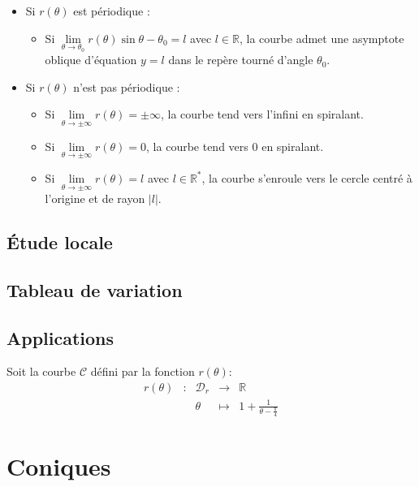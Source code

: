 \begin{prop}
\begin{itemize}
    \item Si $r(\theta)$ est périodique :
    \begin{itemize}
        \item Si $\lim\limits_{\theta\to \theta_0}r(\theta)\sin{\theta-\theta_0}=l$ avec $l\in\mathbb{R}$, la courbe admet une asymptote oblique d'équation $y=l$ dans le repère tourné d'angle $\theta_0$.
    \end{itemize}
    \item Si $r(\theta)$ n'est pas périodique :
    \begin{itemize}
        \item Si $\lim\limits_{\theta\to\pm\infty}r(\theta)=\pm\infty$, la courbe tend vers l'infini en spiralant.
        \item Si $\lim\limits_{\theta\to\pm\infty}r(\theta)=0$, la courbe tend vers $0$ en spiralant.
        \item Si $\lim\limits_{\theta\to\pm\infty}r(\theta)=l$ avec $l\in\mathbb{R}^{*}$, la courbe s'enroule vers le cercle centré à l'origine et de rayon $|l|$.
    \end{itemize}
\end{itemize}
\end{prop}
\subsection{Étude locale}
\subsection{Tableau de variation}
\subsection{Applications}
\begin{ex}
Soit la courbe $\mathscr{C}$ défini par la fonction $r(\theta)$:
$$\begin{array}{ccccc}
    r(\theta) & : & \mathscr{D}_r & \to & \mathbb{R} \\
     & & \theta & \mapsto & 1+\frac{1}{\theta - \frac{\pi}{4}}
\end{array}$$
\end{ex}
\section{Coniques}
